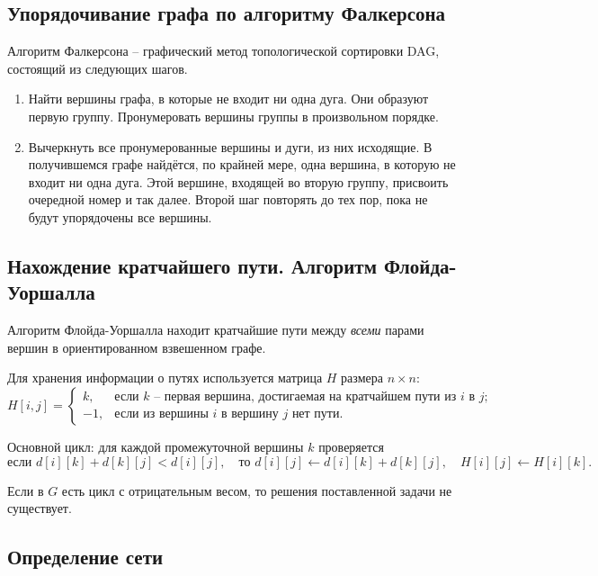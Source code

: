 \subsection{Упорядочивание графа по алгоритму Фалкерсона}

Алгоритм Фалкерсона -- графический метод топологической сортировки DAG,
состоящий из следующих шагов.

\begin{enumerate}
    \item Найти вершины графа, в которые не входит ни одна дуга.
    Они образуют первую группу. Пронумеровать вершины группы в произвольном порядке.

    \item Вычеркнуть все пронумерованные вершины и дуги, из них исходящие.
    В получившемся графе найдётся, по крайней мере, одна вершина, в которую
    не входит ни одна дуга. Этой вершине, входящей во вторую группу, присвоить
    очередной номер и так далее. Второй шаг повторять до тех пор, пока не будут
    упорядочены все вершины.
\end{enumerate}

\subsection{Нахождение кратчайшего пути. Алгоритм Флойда-Уоршалла}

Алгоритм Флойда-Уоршалла находит кратчайшие пути между \textit{всеми} парами
вершин в ориентированном взвешенном графе.

Для хранения информации о путях используется матрица $H$ размера $n \times n$:
\[
H[i, j] =
\begin{cases}
    k, & \text{если $k$~-- первая вершина, достигаемая на кратчайшем
    пути из $i$ в $j$;} \\
    -1, & \text{если из вершины $i$ в вершину $j$ нет пути.}
\end{cases}
\]

Основной цикл: для каждой промежуточной вершины $k$ проверяется
\[
    \text{если } d[i][k] + d[k][j] < d[i][j], \quad
    \text{то } d[i][j] \leftarrow d[i][k] + d[k][j], \quad H[i][j] \leftarrow H[i][k].
\]

Если в $G$ есть цикл с отрицательным весом, то решения
поставленной задачи не существует.

\subsection{Определение сети}

